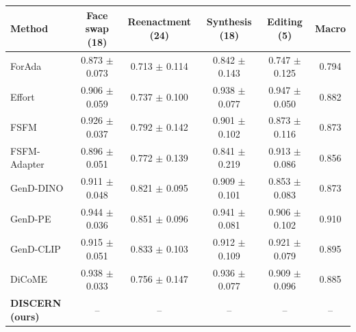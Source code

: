 \begin{tabular}{lccccc}
\toprule
Method & Face swap (18) & Reenactment (24) & Synthesis (18) & Editing (5) & Macro \\
\midrule
ForAda & 0.873 $\pm$ 0.073 & 0.713 $\pm$ 0.114 & 0.842 $\pm$ 0.143 & 0.747 $\pm$ 0.125 & 0.794 \\
Effort & 0.906 $\pm$ 0.059 & 0.737 $\pm$ 0.100 & 0.938 $\pm$ 0.077 & 0.947 $\pm$ 0.050 & 0.882 \\
FSFM & 0.926 $\pm$ 0.037 & 0.792 $\pm$ 0.142 & 0.901 $\pm$ 0.102 & 0.873 $\pm$ 0.116 & 0.873 \\
FSFM-Adapter & 0.896 $\pm$ 0.051 & 0.772 $\pm$ 0.139 & 0.841 $\pm$ 0.219 & 0.913 $\pm$ 0.086 & 0.856 \\
GenD-DINO & 0.911 $\pm$ 0.048 & 0.821 $\pm$ 0.095 & 0.909 $\pm$ 0.101 & 0.853 $\pm$ 0.083 & 0.873 \\
GenD-PE & 0.944 $\pm$ 0.036 & 0.851 $\pm$ 0.096 & 0.941 $\pm$ 0.081 & 0.906 $\pm$ 0.102 & 0.910 \\
GenD-CLIP & 0.915 $\pm$ 0.051 & 0.833 $\pm$ 0.103 & 0.912 $\pm$ 0.109 & 0.921 $\pm$ 0.079 & 0.895 \\
DiCoME & 0.938 $\pm$ 0.033 & 0.756 $\pm$ 0.147 & 0.936 $\pm$ 0.077 & 0.909 $\pm$ 0.096 & 0.885 \\
\textbf{DISCERN (ours)} & -- & -- & -- & -- & -- \\
\bottomrule
\end{tabular}

